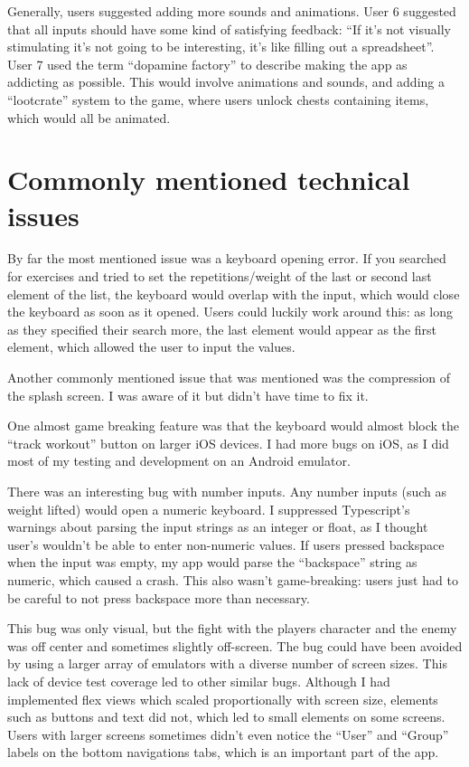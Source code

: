 \documentclass{l4proj}
\begin{document}
Generally, users suggested adding more sounds and animations. User 6 suggested that all inputs should have some kind of satisfying feedback: ``If it's not visually stimulating it's not going to be interesting, it's like filling out a spreadsheet''. User 7 used the term ``dopamine factory'' to describe making the app as addicting as possible. This would involve animations and sounds, and adding a ``lootcrate'' system to the game, where users unlock chests containing items, which would all be animated. 

\section{Commonly mentioned technical issues}
By far the most mentioned issue was a keyboard opening error. If you searched for exercises and tried to set the repetitions/weight of the last or second last element of the list, the keyboard would overlap with the input, which would close the keyboard as soon as it opened. Users could luckily work around this: as long as they specified their search more, the last element would appear as the first element, which allowed the user to input the values.

Another commonly mentioned issue that was mentioned was the compression of the splash screen. I was aware of it but didn't have time to fix it. 

One almost game breaking feature was that the keyboard would almost block the ``track workout'' button on larger iOS devices. I had more bugs on iOS, as I did most of my testing and development on an Android emulator.

There was an interesting bug with number inputs. Any number inputs (such as weight lifted) would open a numeric keyboard. I suppressed Typescript's warnings about parsing the input strings as an integer or float, as I thought user's wouldn't be able to enter non-numeric values. If users pressed backspace when the input was empty, my app would parse the ``backspace'' string as numeric, which caused a crash. This also wasn't game-breaking: users just had to be careful to not press backspace more than necessary.

This bug was only visual, but the fight with the players character and the enemy was off center and sometimes slightly off-screen. The bug could have been avoided by using a larger array of emulators with a diverse number of screen sizes. This lack of device test coverage led to other similar bugs. Although I had implemented flex views which scaled proportionally with screen size, elements such as buttons and text did not, which led to small elements on some screens. Users with larger screens sometimes didn't even notice the ``User'' and ``Group'' labels on the bottom navigations tabs, which is an important part of the app.
\end{document}
